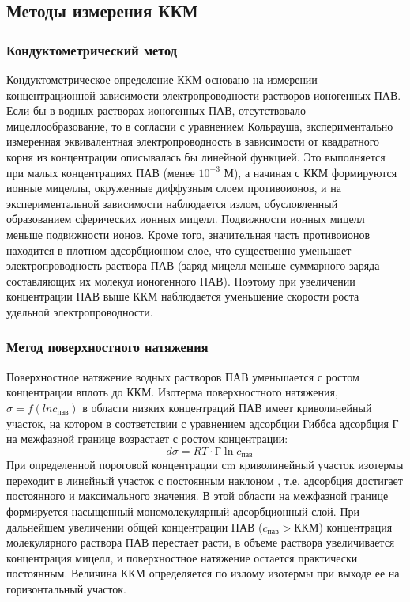 \documentclass[a4paper,12pt]{article} %
\begin{document}
\subsection*{Методы измерения ККМ}
\subsubsection*{Кондуктометрический метод}
Кондуктометрическое определение ККМ основано на измерении
концентрационной зависимости электропроводности растворов ионогенных ПАВ. Если
бы в водных растворах ионогенных ПАВ, отсутствовало мицеллообразование, то в
согласии с уравнением Кольрауша, экспериментально измеренная эквивалентная
электропроводность в зависимости от квадратного корня из концентрации описывалась
бы линейной функцией. Это выполняется при малых концентрациях ПАВ (менее
$10^{-3}$ М), а начиная с ККМ формируются ионные мицеллы, окруженные диффузным слоем
противоионов, и на экспериментальной зависимости наблюдается излом, обусловленный
образованием сферических ионных мицелл.
Подвижности ионных
мицелл меньше
подвижности ионов.
Кроме того,
значительная часть
противоионов
находится в плотном
адсорбционном слое,
что существенно
уменьшает
электропроводность
раствора ПАВ (заряд
мицелл меньше
суммарного заряда составляющих их молекул ионогенного ПАВ). Поэтому при
увеличении концентрации ПАВ выше ККМ наблюдается уменьшение скорости роста
удельной электропроводности.

\subsubsection*{Метод поверхностного натяжения}
Поверхностное натяжение водных растворов ПАВ уменьшается с ростом
концентрации вплоть до ККМ. Изотерма поверхностного натяжения, $\sigma = f (ln
{c_{\text{пав}}})$ в области низких концентраций ПАВ имеет криволинейный участок, на котором в
соответствии с уравнением адсорбции Гиббса адсорбция Г на межфазной границе
возрастает с ростом концентрации:
\[-d\sigma = RT \cdot \text{Г} \ln{c_{\text{пав}}}\]
При определенной пороговой концентрации сm криволинейный участок изотермы
переходит в линейный участок с постоянным наклоном , т.е. адсорбция
достигает постоянного и максимального значения. В этой области на межфазной границе
формируется насыщенный мономолекулярный
адсорбционный слой. При дальнейшем
увеличении общей концентрации ПАВ ($c_{\text{пав}} >
\text{ККМ}$) концентрация молекулярного раствора
ПАВ перестает расти, в объеме раствора
увеличивается концентрация мицелл, и
поверхностное натяжение остается практически
постоянным. Величина ККМ определяется по
излому изотермы при выходе ее на
горизонтальный участок.
\end{document}
